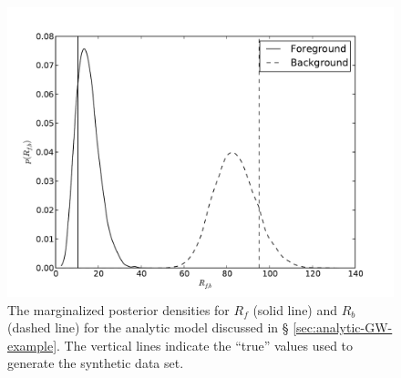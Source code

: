 \documentclass[aps,prd]{revtex4-1}
\begin{document}
\begin{figure}
  \includegraphics[width=\columnwidth]{rates}
  \caption{\label{fig:analytic-rate-recovery} The marginalized
    posterior densities for $R_f$ (solid line) and $R_b$ (dashed line)
    for the analytic model discussed in \S
    \ref{sec:analytic-GW-example}.  The vertical lines indicate the
    ``true'' values used to generate the synthetic data set.}
\end{figure}
\end{document}
